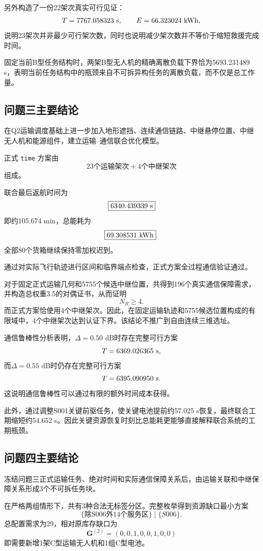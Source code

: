 \documentclass[UTF8,a4paper,12pt]{ctexart}
\begin{document}
另外构造了一份22架次真实可行见证：
\[
T=7767.058323\ {\rm s},
\qquad
E=66.323024\ {\rm kWh},
\]
说明23架次并非最少可行架次数，同时也说明减少架次数并不等价于缩短救援完成时间。

固定当前B型任务结构时，两架B型无人机的精确离散负载下界恰为5693.231489 s，表明当前任务结构中的瓶颈来自不可拆异构任务的离散负载，而不仅是总工作量。

\subsection{问题三主要结论}

在Q2运输调度基础上进一步加入地形遮挡、连续通信链路、中继悬停位置、中继无人机和能源组件，建立运输--通信联合优化模型。

正式 \texttt{time} 方案由
\[
\boxed{
23\text{个运输架次}
+
4\text{个中继架次}
}
\]
组成。

联合最后返航时间为
\[
\boxed{6340.439339\ {\rm s}}
\]
即约105.674 min，总能耗为
\[
\boxed{69.308531\ {\rm kWh}}.
\]
全部80个货箱继续保持零加权迟到。

通过对实际飞行轨迹进行区间和临界端点检查，正式方案全过程通信验证通过。

对于固定正式运输几何和5755个候选中继位置，共得到196个真实通信保障需求，并构造总权重3.5的对偶证书，从而证明
\[
\boxed{N_R\ge4}.
\]
而正式方案恰使用4个中继架次。因此，在固定运输轨迹和5755候选位置构成的有限域中，4个中继架次达到认证下界。该结论不推广到自由连续三维选址。

通信鲁棒性分析表明，$\Delta=0.50$ dB时存在完整可行方案
\[
T=6369.026365\ {\rm s},
\]
而$\Delta=0.55$ dB时仍存在完整可行方案
\[
T=6395.090950\ {\rm s}.
\]
这说明通信鲁棒性可以通过有限的额外时间成本获得。

此外，通过调整S001关键前驱任务，使关键电池提前约57.025 s恢复，最终联合工期缩短约54.652 s。因此关键资源恢复时刻比总能耗更能够直接解释联合系统的工期瓶颈。

\subsection{问题四主要结论}

冻结问题三正式运输任务、绝对时间和实际通信保障关系后，由运输关联和中继保障关系形成3个不可拆任务块。

在严格两组情形下，共有3种合法无标签分区。完整枚举得到资源缺口最小方案
\[
\boxed{
\{\text{除S006外14个服务区}\}
\mid
\{S006\}
}.
\]
总配置需求为29，相对原库存缺口为
\[
\boxed{
\mathbf G^{(2)}
=
(0,0,1,0,0,1,0,0)
}
\]
即需要新增1架C型运输无人机和1组C型电池。
\end{document}
